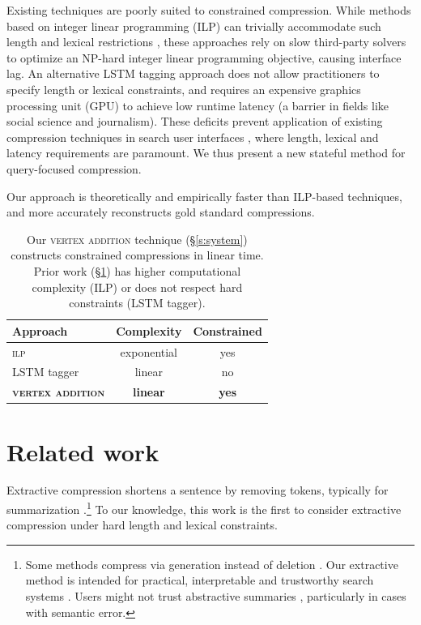 \documentclass[11pt,a4paper]{article}
\begin{document}
Existing techniques are poorly suited to constrained compression. While methods based on integer linear programming (ILP) can trivially accommodate such length and lexical restrictions \cite{clarke2008global,filippova2013overcoming,Wang2017CanSH}, these approaches rely on slow third-party solvers to optimize an NP-hard integer linear programming objective, causing interface lag. An alternative LSTM tagging approach \cite{filippova2015sentence} does not allow practitioners to specify length or lexical constraints, and requires an expensive graphics processing unit (GPU) to achieve low runtime latency (a barrier in fields like social science and journalism). These deficits prevent application of existing compression techniques in search user interfaces \cite{marchionini2006exploratory,hearst2009search}, where length, lexical and latency requirements are paramount. We thus present a new stateful method for query-focused compression. 

Our approach is theoretically and empirically faster than ILP-based techniques, and more accurately reconstructs gold standard compressions.


\begin{table}[htb!]
\begin{tabular}{lcc}
Approach & Complexity & Constrained  \\ \hline
\textsc{ilp}       &   exponential    & yes     \\
LSTM tagger & linear              & no         \\   
\textbf{\textsc{vertex addition}} & \textbf{linear}     &      \textbf{yes}   
\end{tabular}
\caption{Our \textsc{vertex addition} technique (\S\ref{s:system}) constructs constrained compressions in linear time. Prior work (\S\ref{s:relatedwork}) has higher computational complexity (\textsc{ILP}) or does not respect hard constraints (LSTM tagger).} 
\label{t:algos}
\end{table}

\section{Related work}\label{s:relatedwork}

Extractive compression shortens a sentence by removing tokens, typically for summarization \cite{Knight2000StatisticsBasedS,clarke2008global,filippova2015sentence,Wang2017CanSH}.\footnote{Some methods compress via generation instead of deletion \cite{rush2015neural,mallinson18}. Our extractive method is intended for practical, interpretable and trustworthy search systems \cite{Chuang2012InterpretationAT}. Users might not trust abstractive summaries \cite{Zhang:2018:MSG:3290265.3274465}, particularly in cases with semantic error.} To our knowledge, this work is the first to consider extractive compression under hard length and lexical constraints.
\end{document}
